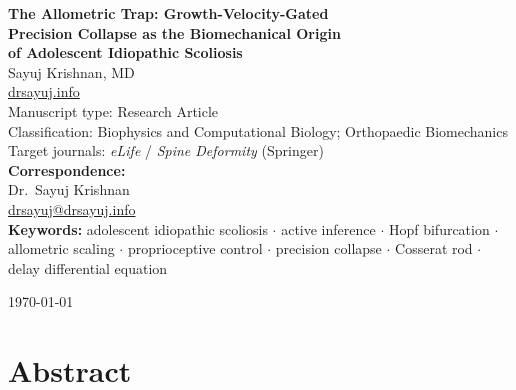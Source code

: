 \documentclass[12pt, letterpaper]{article}
\begin{document}
\begin{titlepage}
  \centering
  \vspace*{2cm}

  {\LARGE \textbf{The Allometric Trap: Growth-Velocity-Gated\\
  Precision Collapse as the Biomechanical Origin\\
  of Adolescent Idiopathic Scoliosis}}\\[1.5em]

  {\large Sayuj Krishnan, MD}\\[0.5em]
  {\normalsize \href{https://drsayuj.info}{drsayuj.info}}\\[2em]

  {\normalsize Manuscript type: Research Article}\\
  {\normalsize Classification: Biophysics and Computational Biology; Orthopaedic Biomechanics}\\[1em]
  {\normalsize Target journals: \textit{eLife} / \textit{Spine Deformity} (Springer)}\\[3em]

  \textbf{Correspondence:}\\
  Dr.\ Sayuj Krishnan\\
  \href{mailto:drsayuj@drsayuj.info}{drsayuj@drsayuj.info}\\[3em]

  \textbf{Keywords:} adolescent idiopathic scoliosis $\cdot$ active inference $\cdot$
  Hopf bifurcation $\cdot$ allometric scaling $\cdot$ proprioceptive control $\cdot$
  precision collapse $\cdot$ Cosserat rod $\cdot$ delay differential equation

  \vfill
  {\normalsize \today}
\end{titlepage}

\newpage
\section*{Abstract}
\end{document}
